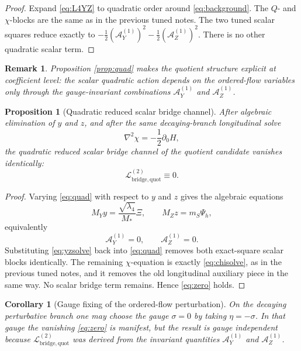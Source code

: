 \documentclass[11pt]{article}
\newcommand{\AY}{\mathcal A_Y}
\newcommand{\AZ}{\mathcal A_Z}
\newtheorem{proposition}{Proposition}
\newtheorem{remark}{Remark}
\newtheorem{corollary}{Corollary}
\begin{document}
\begin{proof}
Expand \eqref{eq:L4YZ} to quadratic order around \eqref{eq:background}. The \(Q\)- and \(\chi\)-blocks are the same as in the previous tuned notes. The two tuned scalar squares reduce exactly to \(-\frac12(\AY^{(1)})^2-\frac12(\AZ^{(1)})^2\). There is no other quadratic scalar term.
\end{proof}

\begin{remark}
Proposition \ref{prop:quad} makes the quotient structure explicit at coefficient level: the scalar quadratic action depends on the ordered-flow variables only through the gauge-invariant combinations \(\AY^{(1)}\) and \(\AZ^{(1)}\).
\end{remark}

\begin{proposition}[Quadratic reduced scalar bridge channel]
\label{prop:reduction}
After algebraic elimination of \(y\) and \(z\), and after the same decaying-branch longitudinal solve
\begin{equation}
\nabla^2\chi=-\frac12\partial_0H,
\label{eq:chisolve}
\end{equation}
the quadratic reduced scalar bridge channel of the quotient candidate vanishes identically:
\begin{equation}
\mathcal L_{\mathrm{bridge,quot}}^{(2)}\equiv 0.
\label{eq:zero}
\end{equation}
\end{proposition}

\begin{proof}
Varying \eqref{eq:quad} with respect to \(y\) and \(z\) gives the algebraic equations
\begin{equation}
M_Yy=\frac{\sqrt{\lambda_4}}{M_*}\Xi,
\qquad
M_Zz=m_S\Psi_h,
\label{eq:yzsolve}
\end{equation}
equivalently
\[
\AY^{(1)}=0,
\qquad
\AZ^{(1)}=0.
\]
Substituting \eqref{eq:yzsolve} back into \eqref{eq:quad} removes both exact-square scalar blocks identically. The remaining \(\chi\)-equation is exactly \eqref{eq:chisolve}, as in the previous tuned notes, and it removes the old longitudinal auxiliary piece in the same way. No scalar bridge term remains. Hence \eqref{eq:zero} holds.
\end{proof}

\begin{corollary}[Gauge fixing of the ordered-flow perturbation]
\label{cor:gaugefix}
On the decaying perturbative branch one may choose the gauge \(\sigma=0\) by taking \(\eta=-\sigma\). In that gauge the vanishing \eqref{eq:zero} is manifest, but the result is gauge independent because \(\mathcal L_{\mathrm{bridge,quot}}^{(2)}\) was derived from the invariant quantities \(\AY^{(1)}\) and \(\AZ^{(1)}\).
\end{corollary}
\end{document}
